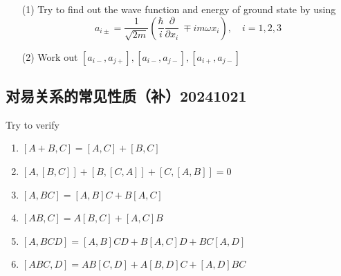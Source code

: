 \documentclass{article}
\newcommand{\Da}[2]{\frac{\partial}{\partial#2}#1}
\begin{document}
\begin{enumerate}
    \item[(1)] Try to find out the wave function and energy of ground state by using
    \begin{equation*}
        a_{i\pm }=\frac{1}{\sqrt{2m}}\left(\frac{\hbar}{i}\Da{~}{x_i}\mp im\omega x_i\right),\quad i=1,2,3
    \end{equation*}
    \item[(2)] Work out $[a_{i-},a_{j+}],[a_{i-},a_{j-}],[a_{i+},a_{j-}]$
\end{enumerate}

\subsection{对易关系的常见性质（补）20241021}

Try to verify
\begin{enumerate}
    \item $\left[A+B,C\right]=\left[A,C\right]+\left[B,C\right]$
    \item $\left[A,\left[B,C\right]\right]+\left[B,\left[C,A\right]\right]+\left[C,\left[A,B\right]\right]=0$
    \item $[A,BC]=[A,B]C+B[A,C]$
    \item $[AB,C]=A[B,C]+[A,C]B$
    \item $[A,BCD]=[A,B]CD+B[A,C]D+BC[A,D]$
    \item $[ABC,D]=AB[C,D]+A[B,D]C+[A,D]BC$
\end{enumerate}
\end{document}
